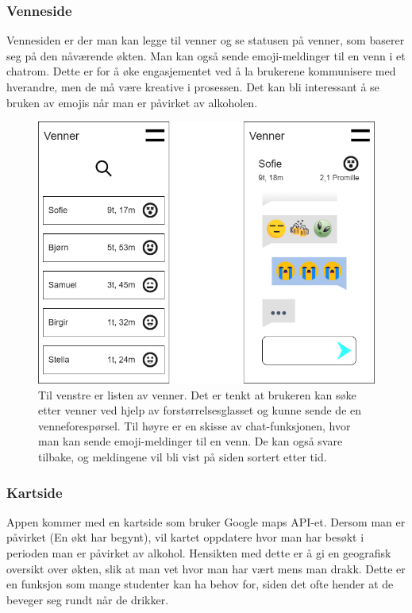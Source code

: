 \documentclass[12pt]{article}
\begin{document}
\subsubsection{Venneside}
Vennesiden er der man kan legge til venner og se statusen på venner, som baserer seg på den nåværende økten. Man kan også sende emoji-meldinger til en venn i et chatrom. Dette er for å øke engasjementet ved å la brukerene kommunisere med hverandre, men de må være kreative i prosessen. Det kan bli interessant å se bruken av emojis når man er påvirket av alkoholen. 

\begin{figure}[H]
    \centering
    \includegraphics[scale=0.4]{images/lille_promille_friends.drawio.png}
    \caption{Til venstre er listen av venner. Det er tenkt at brukeren kan søke etter venner ved hjelp av forstørrelsesglasset og kunne sende de en venneforespørsel. Til høyre er en skisse av chat-funksjonen, hvor man kan sende emoji-meldinger til en venn. De kan også svare tilbake, og meldingene vil bli vist på siden sortert etter tid.}
\end{figure}

\subsubsection{Kartside}
Appen kommer med en kartside som bruker Google maps API-et. Dersom man er påvirket (En økt har begynt), vil kartet oppdatere hvor man har besøkt i perioden man er påvirket av alkohol. Hensikten med dette er å gi en geografisk oversikt over økten, slik at man vet hvor man har vært mens man drakk. Dette er en funksjon som mange studenter kan ha behov for, siden det ofte hender at de beveger seg rundt når de drikker.
\end{document}
